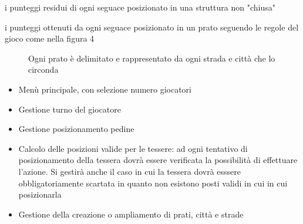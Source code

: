 \subitem i punteggi residui di ogni seguace posizionato in una struttura non "chiusa"

\subitem i punteggi ottenuti da ogni seguace posizionato in un prato seguendo le regole del gioco come nella figura 4

\begin{figure}[]

    \caption{Ogni prato è delimitato e rappresentato da ogni strada e città che lo circonda}
    
\end{figure}

\begin{itemize}
\item Menù principale, con selezione numero giocatori
\end{itemize}
\begin{itemize}
\item Gestione turno del giocatore
\end{itemize}
\begin{itemize}
\item Gestione posizionamento pedine
\end{itemize}
\begin{itemize}
\item Calcolo delle posizioni valide per le tessere: ad ogni tentativo di posizionamento della tessera dovrà essere verificata la possibilità di effettuare l'azione. Si gestirà anche il caso in cui la tessera dovrà esssere obbligatoriamente scartata in quanto non esistono posti validi in cui in cui posizionarla
\end{itemize}
\begin{itemize}
\item Gestione della creazione o ampliamento di prati, città e strade
\end{itemize}

